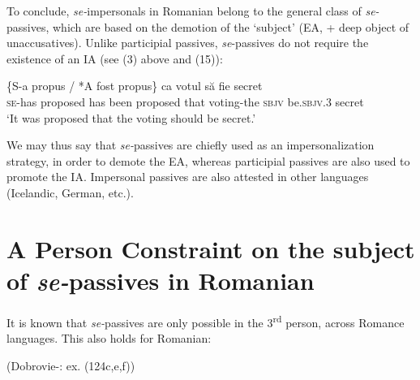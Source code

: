 \documentclass[output=paper]{langsci/langscibook}
\begin{document}
  To conclude, \textit{se-}impersonals in Romanian belong to the general class of \textit{se-}passives, which are based on the demotion of the ‘subject’ (EA, + deep object of unaccusatives). Unlike participial passives, \textit{se}{}-passives do not require the existence of an IA (see (3) above and (15)):

\ea%
    \label{ex:giurgea:15}
    \gll \{S-a      propus    / *A   fost   propus\}   ca   votul          să     fie           secret\\
         \textsc{se-}has proposed    has been proposed that voting-the \textsc{sbjv} be.\textsc{sbjv.3} secret\\
    \glt ‘It was proposed that the voting should be secret.’
    \z

          

We may thus say that \textit{se-}passives are chiefly used as an impersonalization strategy, in order to demote the EA, whereas participial passives are also used to promote the IA. Impersonal passives are also attested in other languages (Icelandic, German, etc.).

\section{A Person Constraint on the subject of \textit{se-}passives in Romanian}%

It is known that \textit{se-}passives are only possible in the 3\textsuperscript{rd} person, across Romance languages. This also holds for Romanian:

\ea%
    (Dobrovie-\citealt{Sorin2017}: ex. (124c,e,f))\label{ex:giurgea:16}\\
    \z
\z
\end{document}
